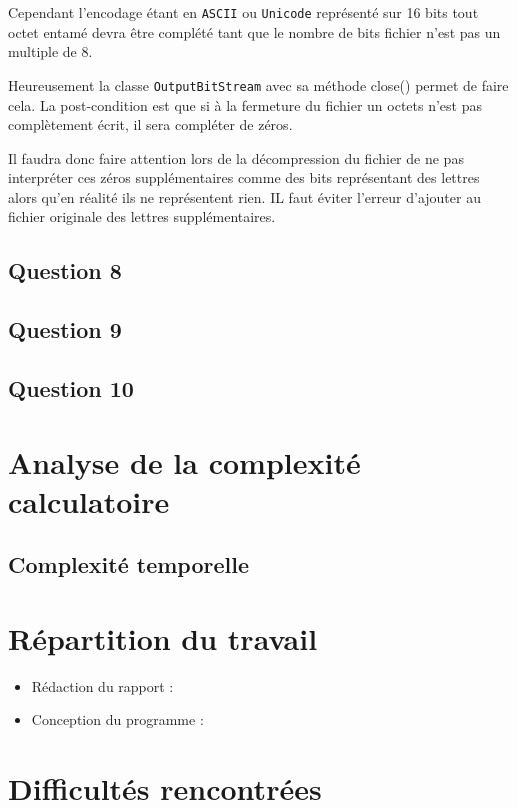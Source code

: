 \documentclass[11pt]{article}
\begin{document}
Cependant l'encodage étant en \verb+ASCII+ ou \verb+Unicode+ représenté sur 16 bits tout octet entamé devra être complété tant que le nombre de bits fichier n'est pas un multiple de 8.

Heureusement la classe \verb+OutputBitStream+ avec sa méthode close() permet de faire cela. La post-condition est que si à la fermeture du fichier un octets n'est pas complètement écrit, il sera compléter de zéros.

Il faudra donc faire attention lors de la décompression du fichier de ne pas interpréter ces zéros supplémentaires comme des bits représentant des lettres alors qu'en réalité ils ne représentent rien. IL faut éviter l'erreur d'ajouter au fichier originale des lettres supplémentaires.


\subsection*{Question 8}
\subsection*{Question 9}
\subsection*{Question 10}


\section{Analyse de la complexité calculatoire}
\subsection{Complexité temporelle}

\section{Répartition du travail}

\begin{itemize}
\item Rédaction du rapport : 
\item Conception du programme : 
\end{itemize}

\section{Difficultés rencontrées}
\end{document}
